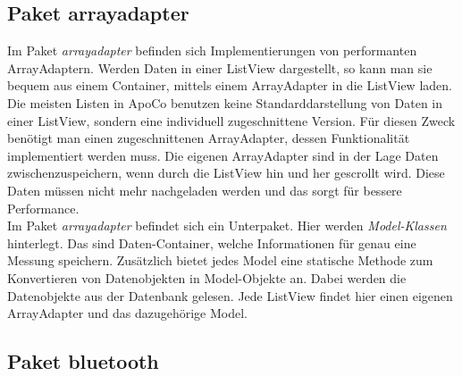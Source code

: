 \subsection*{Paket arrayadapter}

Im Paket \emph{arrayadapter} befinden sich Implementierungen von performanten ArrayAdaptern.
Werden Daten in einer ListView dargestellt,
so kann man sie bequem aus einem Container, 
mittels einem ArrayAdapter in die ListView laden.
Die meisten Listen in ApoCo benutzen keine Standarddarstellung von Daten in einer ListView,
sondern eine individuell zugeschnittene Version.
F\"ur diesen Zweck ben\"otigt man einen zugeschnittenen ArrayAdapter, dessen Funktionalit\"at implementiert werden muss.
Die eigenen ArrayAdapter sind in der Lage Daten zwischenzuspeichern, wenn durch die ListView hin und her gescrollt wird.
Diese Daten m\"ussen nicht mehr nachgeladen werden und das sorgt f\"ur bessere Performance.\\
Im Paket \emph{arrayadapter} befindet sich ein Unterpaket.
Hier werden \emph{Model-Klassen} hinterlegt.
Das sind Daten-Container, welche Informationen f\"ur genau eine Messung speichern.
Zus\"atzlich bietet jedes Model eine statische Methode zum Konvertieren von Datenobjekten in Model-Objekte an. 
Dabei werden die Datenobjekte aus der Datenbank gelesen. 
Jede ListView findet hier einen eigenen ArrayAdapter und das dazugeh\"orige Model.\\

\subsection*{Paket bluetooth}

